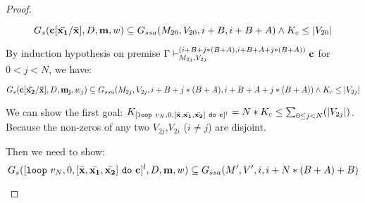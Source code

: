 \documentclass[a4paper,11pt]{article}
\begin{document}
\begin{proof}
\begin{itemize}
\[ G_{s}( \mathbf{{c[\bar{x_1} / \bar{x}]}} ,D,\mathbf{{m}},w) \subseteq G_{ssa}(M_{20}, V_{20} ,i+B, i+B+A) \land K_{   c} \leq |V_{20} |  \]

By induction hypothesis on premise ${\Gamma \vdash^{(i+B+j*(B+A),i+B+A+j*(B+A) )}_{M_{2j}, V_{2j}} \mathbf{{c}} 
}$ for $ 0 <j <N$, we have:

\[ G_{s}( \mathbf{{c[\bar{x_2} / \bar{x}] }},D,\mathbf{{m_j}},w_j) \subseteq G_{ssa}(M_{2j}, V_{2j} ,i+B+j*(B+A), i+B+A+j*(B+A)) \land K_{c} \leq |V_{2j} |  \]

We can show the first goal: $K_{ [\mathtt{loop} ~ v_N, 0, [\bar{\mathbf{{x}}}, \bar{\mathbf{{x_1}}}, \bar{\mathbf{{x_2}}}] ~ \mathtt{do} ~ \mathbf{{c}} ]^{l}} = N* K_{c} \leq \sum_{0\leq j <N}(|V_{2j}|)$. Because the non-zeros of any two $V_{2j}$,$V_{2i}$ ($i \not = j$) are disjoint.

Then we need to show:\[G_{s}( [\mathtt{loop} ~ v_N, 0, [\bar{\mathbf{{x}}}, \bar{\mathbf{{x_1}}}, \bar{\mathbf{{x_2}}}] ~ \mathtt{do} ~ \mathbf{{c}} ]^{l} ,D,\mathbf{{m}},w) \subseteq G_{ssa}(M', V' ,i, i+N*(B+A)+B)\]


\end{itemize}
\end{proof}
\end{document}
